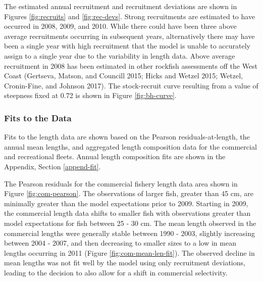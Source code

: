 \documentclass[11pt,
  english,
  a4paper,
]{article}
\begin{document}

The estimated annual recruitment and recruitment deviations are shown in Figures \ref{fig:recruits} and \ref{fig:rec-devs}. Strong recruitments are estimated to have occurred in 2008, 2009, and 2010. While there could have been three above average recruitments occurring in subsequent years, alternatively there may have been a single year with high recruitment that the model is unable to accurately assign to a single year due to the variability in length data. Above average recruitment in 2008 has been estimated in other rockfish assessments off the West Coast {(Gertseva, Matson, and Councill 2015; Hicks and Wetzel 2015; Wetzel, Cronin-Fine, and Johnson 2017)\leavevmode\tagmcend\tagstructend}. The stock-recruit curve resulting from a value of steepness fixed at 0.72 is shown in Figure \ref{fig:bh-curve}.

\leavevmode\tagmcend\tagstructend\par


\hypertarget{fits-to-the-data}{%
\subsubsection{Fits to the Data}\label{fits-to-the-data}}

\leavevmode\tagmcend\tagstructend


Fits to the length data are shown based on the Pearson residuals-at-length, the annual mean lengths, and aggregated length composition data for the commercial and recreational fleets. Annual length composition fits are shown in the Appendix, Section \ref{append-fit}.

\leavevmode\tagmcend\tagstructend\par


The Pearson residuals for the commercial fishery length data area shown in Figure \ref{fig:com-pearson}. The observations of larger fish, greater than 45 cm, are minimally greater than the model expectations prior to 2009. Starting in 2009, the commercial length data shifts to smaller fish with observations greater than model expectations for fish between 25 - 30 cm. The mean length observed in the commercial lengths were generally stable between 1990 - 2003, slightly increasing between 2004 - 2007, and then decreasing to smaller sizes to a low in mean lengths occurring in 2011 (Figure \ref{fig:com-mean-len-fit}). The observed decline in mean lengths was not fit well by the model using only recruitment deviations, leading to the decision to also allow for a shift in commercial selectivity.
\end{document}

